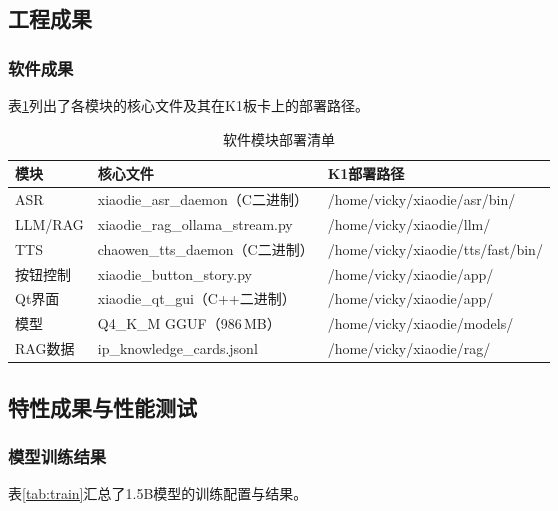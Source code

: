 \documentclass[lettersize,journal]{IEEEtran}
\begin{document}
\subsection{工程成果}

\subsubsection{软件成果}

表\ref{tab:sw_files}列出了各模块的核心文件及其在K1板卡上的部署路径。

\begin{table}[!t]
    \centering
    \caption{软件模块部署清单}
    \label{tab:sw_files}
    \footnotesize
    \begin{tabular}{p{2cm}p{5.5cm}p{6.5cm}}
        \toprule
        \textbf{模块} & \textbf{核心文件} & \textbf{K1部署路径} \\
        \midrule
        ASR & xiaodie\_asr\_daemon（C二进制） & /home/vicky/xiaodie/asr/bin/ \\
        LLM/RAG & xiaodie\_rag\_ollama\_stream.py & /home/vicky/xiaodie/llm/ \\
        TTS & chaowen\_tts\_daemon（C二进制） & /home/vicky/xiaodie/tts/fast/bin/ \\
        按钮控制 & xiaodie\_button\_story.py & /home/vicky/xiaodie/app/ \\
        Qt界面 & xiaodie\_qt\_gui（C++二进制） & /home/vicky/xiaodie/app/ \\
        模型 & Q4\_K\_M GGUF（986\,MB） & /home/vicky/xiaodie/models/ \\
        RAG数据 & ip\_knowledge\_cards.jsonl & /home/vicky/xiaodie/rag/ \\
        \bottomrule
    \end{tabular}
\end{table}

\subsection{特性成果与性能测试}

\subsubsection{模型训练结果}

表\ref{tab:train}汇总了1.5B模型的训练配置与结果。
\end{document}
